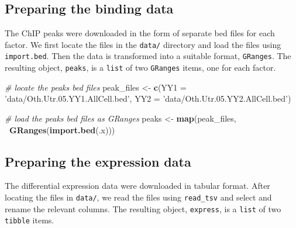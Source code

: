 \documentclass[9pt,a4paper,]{extarticle}
\newenvironment{Shaded}{\begin{snugshade}}{\end{snugshade}}
\newcommand{\CommentTok}[1]{\textcolor[rgb]{0.56,0.35,0.01}{\textit{#1}}}
\newcommand{\DataTypeTok}[1]{\textcolor[rgb]{0.13,0.29,0.53}{#1}}
\newcommand{\KeywordTok}[1]{\textcolor[rgb]{0.13,0.29,0.53}{\textbf{#1}}}
\newcommand{\NormalTok}[1]{#1}
\newcommand{\OperatorTok}[1]{\textcolor[rgb]{0.81,0.36,0.00}{\textbf{#1}}}
\newcommand{\StringTok}[1]{\textcolor[rgb]{0.31,0.60,0.02}{#1}}
\begin{document}
\hypertarget{preparing-the-binding-data}{%
\subsection{Preparing the binding data}\label{preparing-the-binding-data}}

The ChIP peaks were downloaded in the form of separate bed files for each factor. We first locate the files in the \texttt{data/} directory and load the files using \texttt{import.bed}. Then the data is transformed into a suitable format, \texttt{GRanges}. The resulting object, \texttt{peaks}, is a \texttt{list} of two \texttt{GRanges} items, one for each factor.

\begin{Shaded}
\begin{Highlighting}[]
\CommentTok{# locate the peaks bed files}
\NormalTok{peak_files <-}\StringTok{ }\KeywordTok{c}\NormalTok{(}\DataTypeTok{YY1 =} \StringTok{'data/Oth.Utr.05.YY1.AllCell.bed'}\NormalTok{,}
                \DataTypeTok{YY2 =} \StringTok{'data/Oth.Utr.05.YY2.AllCell.bed'}\NormalTok{)}

\CommentTok{# load the peaks bed files as GRanges}
\NormalTok{peaks <-}\StringTok{ }\KeywordTok{map}\NormalTok{(peak_files, }\OperatorTok{~}\KeywordTok{GRanges}\NormalTok{(}\KeywordTok{import.bed}\NormalTok{(.x)))}
\end{Highlighting}
\end{Shaded}

\hypertarget{preparing-the-expression-data}{%
\subsection{Preparing the expression data}\label{preparing-the-expression-data}}

The differential expression data were downloaded in tabular format. After locating the files in \texttt{data/}, we read the files using \texttt{read\_tsv} and select and rename the relevant columns. The resulting object, \texttt{express}, is a \texttt{list} of two \texttt{tibble} items.
\end{document}
